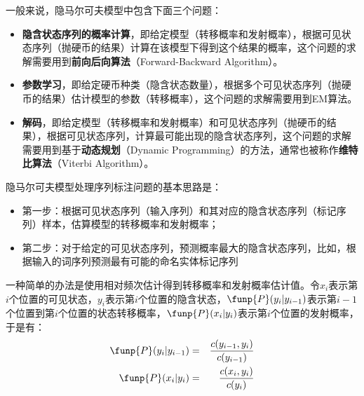 \parinterval 一般来说，隐马尔可夫模型中包含下面三个问题：

\begin{itemize}
\vspace{0.5em}
\item {\small\sffamily\bfseries{隐含状态序列的概率计算}}，即给定模型（转移概率和发射概率），根据可见状态序列（抛硬币的结果）计算在该模型下得到这个结果的概率，这个问题的求解需要用到{\small\sffamily\bfseries{前向后向算法}}（Forward-Backward Algorithm）。
\vspace{0.5em}
\item {\small\sffamily\bfseries{参数学习}}，即给定硬币种类（隐含状态数量），根据多个可见状态序列（抛硬币的结果）估计模型的参数（转移概率），这个问题的求解需要用到EM算法。
\vspace{0.5em}
\item {\small\sffamily\bfseries{解码}}，即给定模型（转移概率和发射概率）和可见状态序列（抛硬币的结果），根据可见状态序列，计算最可能出现的隐含状态序列，这个问题的求解需要用到基于{\small\sffamily\bfseries{动态规划}}（Dynamic Programming）的方法，通常也被称作{\small\sffamily\bfseries{维特比算法}}（Viterbi Algorithm）。
\vspace{0.5em}
\end{itemize}

\parinterval 隐马尔可夫模型处理序列标注问题的基本思路是：

\begin{itemize}
\vspace{0.5em}
\item 第一步：根据可见状态序列（输入序列）和其对应的隐含状态序列（标记序列）样本，估算模型的转移概率和发射概率；
\vspace{0.5em}
\item 第二步：对于给定的可见状态序列，预测概率最大的隐含状态序列，比如，根据输入的词序列预测最有可能的命名实体标记序列
\vspace{0.5em}
\end{itemize}

\parinterval 一种简单的办法是使用相对频次估计得到转移概率和发射概率估计值。令$x_i$表示第$i$个位置的可见状态，$y_i$表示第$i$个位置的隐含状态，$\funp{P}(y_i|y_{i-1})$表示第$i-1$个位置到第$i$个位置的状态转移概率，$\funp{P}(x_i|y_{i}) $表示第$i$个位置的发射概率，于是有：
\begin{eqnarray}
\funp{P}(y_i|y_{i-1}) &=& \frac{{c}(y_{i-1},y_i)}{{c}(y_{i-1})}
\label{eq:3.3-1}\\
\funp{P}(x_i|y_{i}) &=& \frac{{c}(x_i,y_i)}{{c}(y_i)}
\label{eq:3.3-2}
\end{eqnarray}

